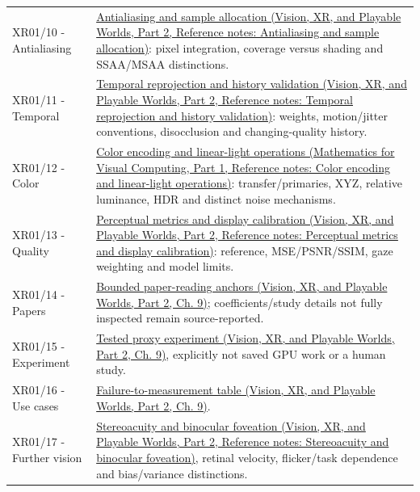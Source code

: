 {\begin{longtable}[]{@{}
  >{\raggedright\arraybackslash}p{}
  >{\raggedright\arraybackslash}p{}@{}}
XR01/10 - Antialiasing & \href{../07-Vision-XR-and-Playable-Worlds-P02/main.pdf\#nameddest=appendix-4192b2bdd21e}{Antialiasing and sample allocation (Vision, XR, and Playable Worlds, Part 2, Reference notes: Antialiasing and sample allocation)}: pixel integration, coverage versus shading and SSAA/MSAA distinctions. \\
XR01/11 - Temporal & \href{../07-Vision-XR-and-Playable-Worlds-P02/main.pdf\#nameddest=appendix-0727340a4428}{Temporal reprojection and history validation (Vision, XR, and Playable Worlds, Part 2, Reference notes: Temporal reprojection and history validation)}: weights, motion/jitter conventions, disocclusion and changing-quality history. \\
XR01/12 - Color & \href{../02-Mathematics-for-Visual-Computing-P01/main.pdf\#nameddest=appendix-a9f83ad40792}{Color encoding and linear-light operations (Mathematics for Visual Computing, Part 1, Reference notes: Color encoding and linear-light operations)}: transfer/primaries, XYZ, relative luminance, HDR and distinct noise mechanisms. \\
XR01/13 - Quality & \href{../07-Vision-XR-and-Playable-Worlds-P02/main.pdf\#nameddest=appendix-b2c1846508bf}{Perceptual metrics and display calibration (Vision, XR, and Playable Worlds, Part 2, Reference notes: Perceptual metrics and display calibration)}: reference, MSE/PSNR/SSIM, gaze weighting and model limits. \\
XR01/14 - Papers & \href{../07-Vision-XR-and-Playable-Worlds-P02/main.pdf\#nameddest=04-visual-computing-ii-ch042-read-research-as-a-chain-of-questions-methods-and-bounded-conclusions}{Bounded paper-reading anchors (Vision, XR, and Playable Worlds, Part 2, Ch. 9)}; coefficients/study details not fully inspected remain source-reported. \\
XR01/15 - Experiment & \href{../07-Vision-XR-and-Playable-Worlds-P02/main.pdf\#nameddest=04-visual-computing-ii-ch042-complete-numerical-and-image-space-laboratory}{Tested proxy experiment (Vision, XR, and Playable Worlds, Part 2, Ch. 9)}, explicitly not saved GPU work or a human study. \\
XR01/16 - Use cases & \href{../07-Vision-XR-and-Playable-Worlds-P02/main.pdf\#nameddest=04-visual-computing-ii-ch042-diagnose-a-symptom-by-the-quantity-that-failed}{Failure-to-measurement table (Vision, XR, and Playable Worlds, Part 2, Ch. 9)}. \\
XR01/17 - Further vision & \href{../07-Vision-XR-and-Playable-Worlds-P02/main.pdf\#nameddest=appendix-8dc848f14052}{Stereoacuity and binocular foveation (Vision, XR, and Playable Worlds, Part 2, Reference notes: Stereoacuity and binocular foveation)}, retinal velocity, flicker/task dependence and bias/variance distinctions. \\

\end{longtable}}
